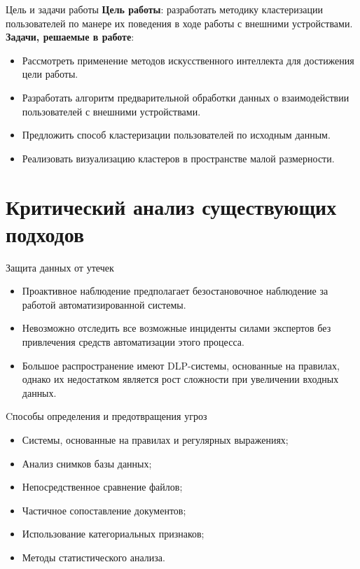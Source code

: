 \documentclass{beamer}
\begin{document}
\begin{frame}{Цель и задачи работы}
    \textbf{Цель работы}: 
    разработать методику кластеризации пользователей по манере их поведения в ходе работы с внешними устройствами.
    \newline
    \textbf{Задачи, решаемые в работе}:
    \begin{itemize}
        \item Рассмотреть применение методов искусственного интеллекта для достижения цели работы.
        \item Разработать алгоритм предварительной обработки данных о взаимодействии пользователей с внешними устройствами.
        \item Предложить способ кластеризации пользователей по исходным данным.
        \item Реализовать визуализацию кластеров в пространстве малой размерности.
    \end{itemize}
\end{frame}

\section{Критический анализ существующих подходов}
\begin{frame}{Защита данных от утечек}
    \begin{itemize}
        \item Проактивное наблюдение предполагает безостановочное наблюдение за работой автоматизированной системы. 
        \item Невозможно отследить все возможные инциденты силами экспертов без привлечения средств автоматизации этого процесса. 
        \item Большое распространение имеют DLP-системы, основанные на правилах, однако их недостатком является рост сложности при увеличении входных данных. 
    \end{itemize}
\end{frame}

\begin{frame}{Cпособы определения и предотвращения угроз}
    \begin{itemize}
        \item Системы, основанные на правилах и регулярных выражениях;
        \item Анализ снимков базы данных;
        \item Непосредственное сравнение файлов;
        \item Частичное сопоставление документов;
        \item Использование категориальных признаков;
        \item Методы статистического анализа.
    \end{itemize}
\end{frame}
\end{document}
